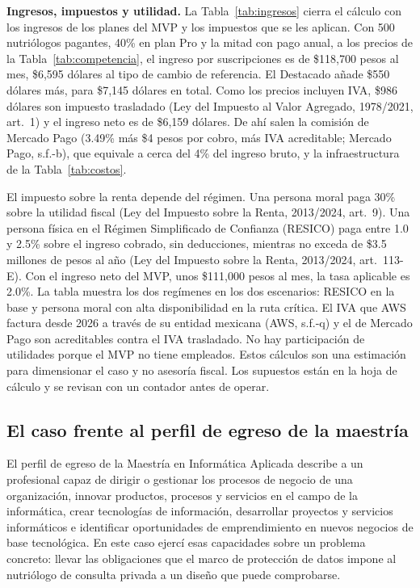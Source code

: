 \documentclass[12pt, a4paper]{article}
\begin{document}
\textbf{Ingresos, impuestos y utilidad.} La Tabla~\ref{tab:ingresos}
cierra el cálculo con los ingresos de los planes del MVP y los impuestos
que se les aplican. Con 500 nutriólogos pagantes, 40\% en plan Pro y la
mitad con pago anual, a los precios de la Tabla~\ref{tab:competencia},
el ingreso por suscripciones es de \$118,700 pesos al mes, \$6,595
dólares al tipo de cambio de referencia. El Destacado añade \$550
dólares más, para \$7,145 dólares en total. Como los precios incluyen
IVA, \$986 dólares son impuesto trasladado (Ley del Impuesto al Valor
Agregado, 1978/2021, art.~1) y el ingreso neto es de \$6,159 dólares. De
ahí salen la comisión de Mercado Pago (3.49\% más \$4 pesos por cobro,
más IVA acreditable; Mercado Pago, s.f.-b), que equivale a cerca del 4\%
del ingreso bruto, y la infraestructura de la Tabla~\ref{tab:costos}.

El impuesto sobre la renta depende del régimen. Una persona moral paga
30\% sobre la utilidad fiscal (Ley del Impuesto sobre la Renta,
2013/2024, art.~9). Una persona física en el Régimen Simplificado de
Confianza (RESICO) paga entre 1.0 y 2.5\% sobre el ingreso cobrado, sin
deducciones, mientras no exceda de \$3.5 millones de pesos al año (Ley
del Impuesto sobre la Renta, 2013/2024, art.~113-E). Con el ingreso neto
del MVP, unos \$111,000 pesos al mes, la tasa aplicable es 2.0\%. La
tabla muestra los dos regímenes en los dos escenarios: RESICO en la base
y persona moral con alta disponibilidad en la ruta crítica. El IVA que
AWS factura desde 2026 a través de su entidad
mexicana (AWS, s.f.-q) y el de Mercado Pago son acreditables contra el
IVA trasladado. No hay participación de utilidades porque el MVP no
tiene empleados. Estos cálculos son una estimación para dimensionar el
caso y no asesoría fiscal. Los supuestos están en la hoja de cálculo y
se revisan con un contador antes de operar.
 
\subsection{El caso frente al perfil de egreso de la maestría}
El perfil de egreso de la Maestría en Informática Aplicada describe a un
profesional capaz de dirigir o gestionar los procesos de negocio de una
organización, innovar productos, procesos y servicios en el campo de la
informática, crear tecnologías de información, desarrollar proyectos y
servicios informáticos e identificar oportunidades de emprendimiento en
nuevos negocios de base tecnológica. En este caso ejercí esas
capacidades sobre un problema concreto: llevar las obligaciones que el
marco de protección de datos impone al nutriólogo de consulta privada a
un diseño que puede comprobarse.
\end{document}
